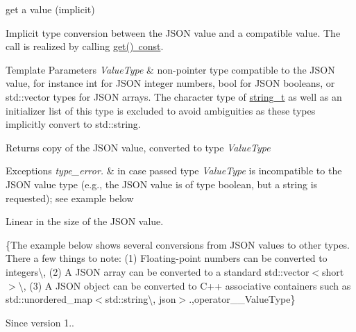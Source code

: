get a value (implicit) 

Implicit type conversion between the J\+S\+ON value and a compatible value. The call is realized by calling \mbox{\hyperlink{classnlohmann_1_1basic__json_a6b187a22994c12c8cae0dd5ee99dc85e}{get() const}}.


\begin{DoxyTemplParams}{Template Parameters}
{\em Value\+Type} & non-\/pointer type compatible to the J\+S\+ON value, for instance {\ttfamily int} for J\+S\+ON integer numbers, {\ttfamily bool} for J\+S\+ON booleans, or {\ttfamily std\+::vector} types for J\+S\+ON arrays. The character type of \mbox{\hyperlink{classnlohmann_1_1basic__json_a61f8566a1a85a424c7266fb531dca005}{string\+\_\+t}} as well as an initializer list of this type is excluded to avoid ambiguities as these types implicitly convert to {\ttfamily std\+::string}.\\
\hline
\end{DoxyTemplParams}
\begin{DoxyReturn}{Returns}
copy of the J\+S\+ON value, converted to type {\itshape Value\+Type} 
\end{DoxyReturn}

\begin{DoxyExceptions}{Exceptions}
{\em type\+\_\+error.} & in case passed type {\itshape Value\+Type} is incompatible to the J\+S\+ON value type (e.\+g., the J\+S\+ON value is of type boolean, but a string is requested); see example below\\
\hline
\end{DoxyExceptions}
Linear in the size of the J\+S\+ON value.

\{The example below shows several conversions from J\+S\+ON values to other types. There a few things to note\+: (1) Floating-\/point numbers can be converted to integers\textbackslash{}, (2) A J\+S\+ON array can be converted to a standard {\ttfamily std\+::vector$<$short$>$}\textbackslash{}, (3) A J\+S\+ON object can be converted to C++ associative containers such as {\ttfamily std\+::unordered\+\_\+map$<$std\+::string\textbackslash{}, json$>$}.,operator\+\_\+\+\_\+\+Value\+Type\}

\begin{DoxySince}{Since}
version 1.. 
\end{DoxySince}
\mbox{\label{classnlohmann_1_1basic__json_aea1085f2d35cc0e1ce119cf0110119e6}} 
